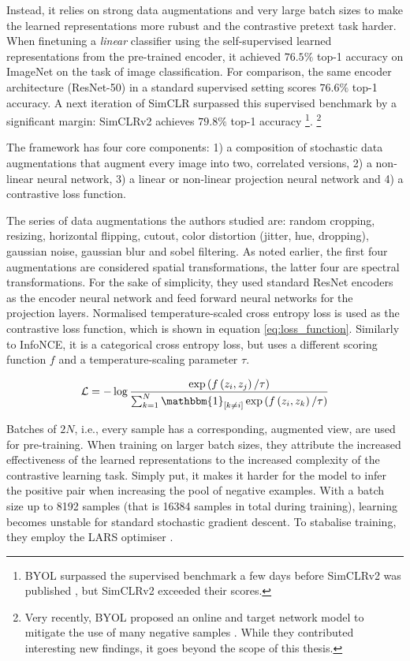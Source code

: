 Instead, it relies on strong data augmentations and very large batch sizes to make the learned representations more rubust and the contrastive pretext task harder.
When finetuning a \textit{linear} classifier using the self-supervised learned representations from the pre-trained encoder, it achieved $76.5\%$ top-1 accuracy on ImageNet on the task of image classification.
For comparison, the same encoder architecture (ResNet-50) in a standard supervised setting scores $76.6\%$ top-1 accuracy.
A next iteration of SimCLR surpassed this supervised benchmark by a significant margin: SimCLRv2 achieves $79.8\%$ top-1 accuracy \cite{chen2020big}\footnote{BYOL surpassed the supervised benchmark a few days before SimCLRv2 was published \cite{Grill2020BootstrapYO}, but SimCLRv2 exceeded their scores.}.
\footnote{Very recently, BYOL proposed an online and target network model to mitigate the use of many negative samples \cite{Grill2020BootstrapYO}.
While they contributed interesting new findings, it goes beyond the scope of this thesis.}

The framework has four core components: 1) a composition of stochastic data augmentations that augment every image into two, correlated versions, 2) a non-linear neural network, 3) a linear or non-linear projection neural network and 4) a contrastive loss function.

The series of data augmentations the authors studied are: random cropping, resizing, horizontal flipping, cutout, color distortion (jitter, hue, dropping), gaussian noise, gaussian blur and sobel filtering. As noted earlier, the first four augmentations are considered spatial transformations, the latter four are spectral transformations.
For the sake of simplicity, they used standard ResNet encoders as the encoder neural network and feed forward neural networks for the projection layers.
Normalised temperature-scaled cross entropy loss is used as the contrastive loss function, which is shown in equation \ref{eq:loss_function}. Similarly to InfoNCE, it is a categorical cross entropy loss, but uses a different scoring function $f$ and a temperature-scaling parameter $\tau$.

\begin{equation}
    \mathcal{L} =-\log \frac{\exp \left(f\left(z_{i}, z_{j}\right) / \tau\right)}{\sum_{k=1}^{N} \mathbbm{1}_{[k \neq i]} \exp \left(f\left(z_{i}, z_{k}\right) / \tau\right)}
    \label{eq:loss_function}
\end{equation}


Batches of $2N$, i.e., every sample has a corresponding, augmented view, are used for pre-training. When training on larger batch sizes, they attribute the increased effectiveness of the learned representations to the increased complexity of the contrastive learning task. Simply put, it makes it harder for the model to infer the positive pair when increasing the pool of negative examples. With a batch size up to 8192 samples (that is 16384 samples in total during training), learning becomes unstable for standard stochastic gradient descent. To stabalise training, they employ the LARS optimiser \cite{You2017LargeBT}.

